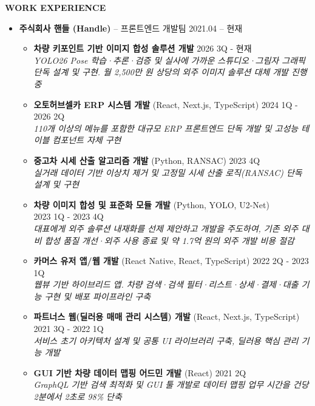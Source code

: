 \documentclass[a4paper, 11pt]{article}
\newcommand{\csection}[2]{
    \vspace{12pt}
    {\Large\textbf{#1}} \hrulefill \\ \vspace{3pt}
    #2
}
\begin{document}
\csection{WORK EXPERIENCE}{
    \begin{itemize}[leftmargin=*, itemsep=8pt]
        \item \textbf{주식회사 핸들 (Handle)} -- 프론트엔드 개발팀 \hfill 2021.04 -- 현재
        \begin{itemize}[label={-}, noitemsep, topsep=3pt]
             \item \textbf{차량 키포인트 기반 이미지 합성 솔루션 개발} \hfill 2026 3Q - 현재 \\
             \textit{YOLO26 Pose 학습·추론·검증 및 실사에 가까운 스튜디오·그림자 그래픽 단독 설계 및 구현. 월 2,500만 원 상당의 외주 이미지 솔루션 대체 개발 진행 중}

             \item \textbf{오토허브셀카 ERP 시스템 개발} (React, Next.js, TypeScript) \hfill 2024 1Q - 2026 2Q \\
             \textit{110개 이상의 메뉴를 포함한 대규모 ERP 프론트엔드 단독 개발 및 고성능 테이블 컴포넌트 자체 구현}
             
             \item \textbf{중고차 시세 산출 알고리즘 개발} (Python, RANSAC) \hfill 2023 4Q \\
             \textit{실거래 데이터 기반 이상치 제거 및 고정밀 시세 산출 로직(RANSAC) 단독 설계 및 구현}

             \item \textbf{차량 이미지 합성 및 표준화 모듈 개발} (Python, YOLO, U2-Net) \\
             \hfill 2023 1Q - 2023 4Q \\
             \textit{대표에게 외주 솔루션 내재화를 선제 제안하고 개발을 주도하여, 기존 외주 대비 합성 품질 개선·외주 사용 종료 및 약 1.7억 원의 외주 개발 비용 절감}

             \item \textbf{카머스 유저 앱/웹 개발} (React Native, React, TypeScript) \hfill 2022 2Q - 2023 1Q \\
             \textit{웹뷰 기반 하이브리드 앱. 차량 검색·검색 필터·리스트·상세·결제·대출 기능 구현 및 배포 파이프라인 구축}

             \item \textbf{파트너스 웹(딜러용 매매 관리 시스템) 개발} (React, Next.js, TypeScript) \hfill 2021 3Q - 2022 1Q \\
             \textit{서비스 초기 아키텍처 설계 및 공통 UI 라이브러리 구축, 딜러용 핵심 관리 기능 개발}

             \item \textbf{GUI 기반 차량 데이터 맵핑 어드민 개발} (React) \hfill 2021 2Q \\
             \textit{GraphQL 기반 검색 최적화 및 GUI 툴 개발로 데이터 맵핑 업무 시간을 건당 2분에서 2초로 98\% 단축}
        \end{itemize}
    \end{itemize}
}
\end{document}
